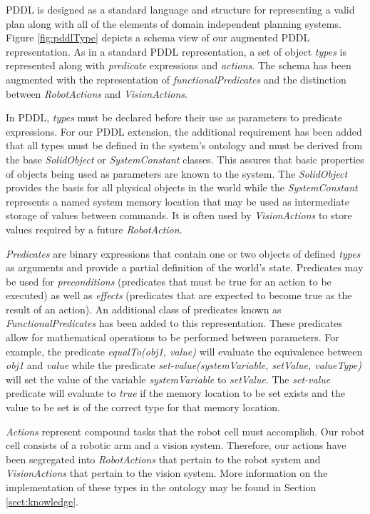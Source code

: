 PDDL is designed as a standard language and structure for 
representing a valid plan along with all of the elements of
domain independent planning systems. Figure \ref{fig:pddlType}
depicts a schema view of our augmented PDDL representation.
As in a standard PDDL representation, a set of object {\it types} 
is represented along with \textit{predicate} expressions and 
{\it actions}. The schema has been augmented with the
representation of \textit{functionalPredicates} and
the distinction between \textit{RobotActions} and
\textit{VisionActions}.

In PDDL, {\it types} must be declared before their use as
parameters to predicate expressions. For our PDDL extension,
the additional requirement has been added that all types must
be defined in the system's ontology and must be derived from the base
\textit{SolidObject} or \textit{SystemConstant}
classes. This assures that basic properties of
objects being used as parameters are known to the system.
The \textit{SolidObject} provides the basis for all physical
objects in the world while the \textit{SystemConstant}
represents a named system memory location that may be used as intermediate 
storage of values between commands. It is often used by \textit{VisionActions}
to store values required by a future \textit{RobotAction}.

\textit{Predicates} are binary expressions that contain one or 
two objects
of defined \textit{types} as arguments and provide a partial 
definition of the world's state. Predicates may be used for 
\textit{preconditions} (predicates that must be true for an
action to be executed) as well as \textit{effects} (predicates
that are expected to become true as the result of an action).
An additional class of predicates known as \textit{FunctionalPredicates}
has been added to this representation. These predicates allow for
mathematical operations to be performed between parameters. For example,
the predicate \textit{equalTo(obj1, value)} will evaluate the
equivalence between \textit{obj1} and \textit{value} while the predicate
\textit{set-value(systemVariable, setValue, valueType)} will set the value of the variable 
\textit{systemVariable} to \textit{setValue}. The \textit{set-value} predicate
will evaluate to \textit{true} if the memory location to be set exists and the value
to be set is of the correct type for that memory location.

\textit{Actions} represent compound tasks that the robot cell must accomplish.
Our robot cell consists of a robotic arm and a vision system. Therefore, our
actions have been segregated into \textit{RobotActions} that pertain to the robot system
and \textit{VisionActions} that pertain to the vision system.
More information on the implementation of these types in the ontology may be found in Section \ref{sect:knowledge}. 
